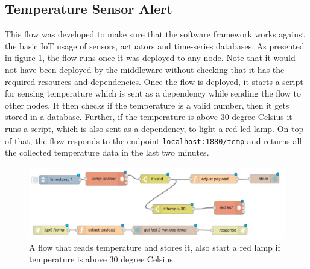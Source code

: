 \subsection{Temperature Sensor Alert}
This flow was developed to make sure that the software framework works against the basic IoT usage of sensors, actuators and time-series databases. As presented in figure \ref{fig:flow-temp}, the flow runs once it was deployed to any node. Note that it would not have been deployed by the middleware without checking that it has the required resources and dependencies. Once the flow is deployed, it starts a script for sensing temperature  which is sent as a dependency while sending the flow to other nodes. It then checks if the temperature is a valid number, then it gets stored in a database. Further, if the temperature is above 30 degree Celsius it runs a script, which is also sent as a dependency, to light a red led lamp. On top of that, the flow responds to the endpoint \verb|localhost:1880/temp| and returns all the collected temperature data in the last two minutes.
 \begin{figure}[H]
	\centering
	\includegraphics[scale=0.6]{images/flow-temp.png}
	\caption{A flow that reads temperature and stores it, also start a red lamp if temperature is above 30 degree Celsius.}
	\label{fig:flow-temp}
\end{figure}
